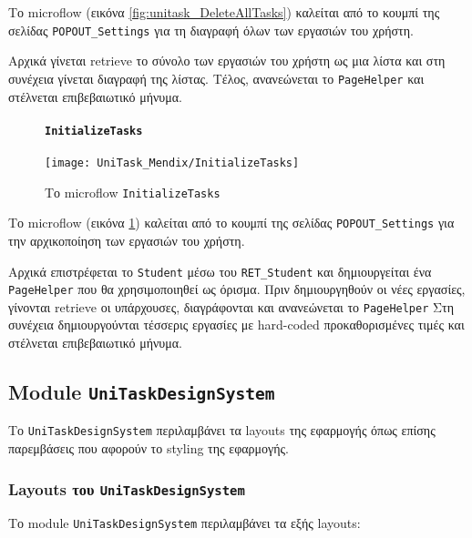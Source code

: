                 Το microflow (εικόνα \ref{fig:unitask_DeleteAllTasks}) καλείται από το κουμπί της σελίδας \texttt{POPOUT\_Settings} για τη διαγραφή όλων των εργασιών του χρήστη.

                Αρχικά γίνεται retrieve το σύνολο των εργασιών του χρήστη ως μια λίστα και στη συνέχεια γίνεται διαγραφή της λίστας. Τέλος, ανανεώνεται το \texttt{PageHelper} και στέλνεται επιβεβαιωτικό μήνυμα.

                \begin{figure}[H] \noindent
                    \paragraph{\texttt{InitializeTasks}}
                    \begin{center}
                        \texttt{[image: UniTask\_Mendix/InitializeTasks]}
                        \caption{\centering Το microflow \texttt{InitializeTasks}}
                        \label{fig:unitask_InitializeTasks}
                    \end{center}
                \end{figure}

                Το microflow (εικόνα \ref{fig:unitask_InitializeTasks}) καλείται από το κουμπί της σελίδας \texttt{POPOUT\_Settings} για την αρχικοποίηση των εργασιών του χρήστη.

                Αρχικά επιστρέφεται το \texttt{Student} μέσω του \texttt{RET\_Student} και δημιουργείται ένα \texttt{PageHelper} που θα χρησιμοποιηθεί ως όρισμα. Πριν δημιουργηθούν οι νέες εργασίες, γίνονται retrieve οι υπάρχουσες, διαγράφονται και ανανεώνεται το \texttt{PageHelper} Στη συνέχεια δημιουργούνται τέσσερις εργασίες με hard-coded προκαθορισμένες τιμές και στέλνεται επιβεβαιωτικό μήνυμα.

        \subsection{Module \texttt{UniTaskDesignSystem}}
            Το \texttt{UniTaskDesignSystem} περιλαμβάνει τα layouts της εφαρμογής όπως επίσης παρεμβάσεις που αφορούν το styling της εφαρμογής.

            \subsubsection{Layouts του \texttt{UniTaskDesignSystem}}
                Το module \texttt{UniTaskDesignSystem} περιλαμβάνει τα εξής layouts:

